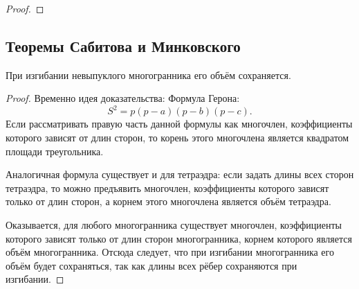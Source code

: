 \begin{proof}

    
\end{proof}


\subsection{Теоремы Сабитова и Минковского}
\begin{theorem}[Сабитов]
    При изгибании невыпуклого многогранника его объём сохраняется.
\end{theorem}
\begin{proof}
    Временно идея доказательства: Формула Герона:
    \[S^2 = p(p - a)(p - b)(p - c).\]
    Если рассматривать правую часть данной формулы как многочлен, коэффициенты которого зависят от длин сторон, то корень этого многочлена является квадратом площади треугольника.

    Аналогичная формула существует и для тетраэдра: если задать длины всех сторон тетраэдра, то можно предъявить многочлен, коэффициенты которого зависят только от длин сторон, а корнем этого многочлена является объём тетраэдра.

    Оказывается, для любого многогранника существует многочлен, коэффициенты которого зависят только от длин сторон многогранника, корнем которого является объём многогранника. Отсюда следует, что при изгибании многогранника его объём будет сохраняться, так как длины всех рёбер сохраняются при изгибании.
\end{proof}


